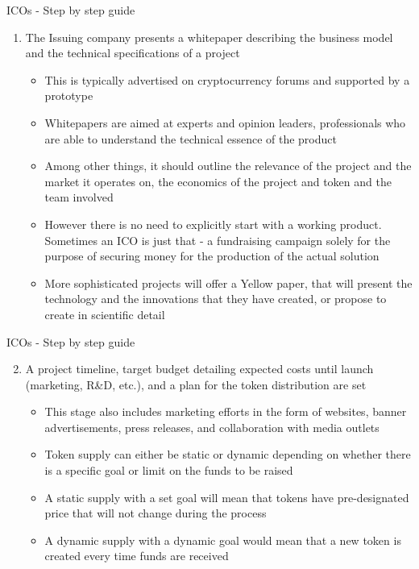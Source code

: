\documentclass[10pt]{beamer}
\begin{document}
\begin{frame}{ICOs - Step by step guide}
	\begin{enumerate}
		\item The Issuing company presents a whitepaper describing the business model and the technical specifications of a project
		\begin{itemize}
			\item This is typically advertised on cryptocurrency forums and supported by a prototype
			\item Whitepapers are aimed at experts and opinion leaders, professionals who are able to understand the technical essence of the product
			\item Among other things, it should outline the relevance of the project and the market it operates on, the economics of the project and token and the team involved
			\item However there is no need to explicitly start with a working product. Sometimes an ICO is just that - a fundraising campaign solely for the purpose of securing money for the production of the actual solution
			\item More sophisticated projects will offer a Yellow paper, that will present the technology and the innovations that they have created, or propose to create in scientific detail
		\end{itemize}
	\end{enumerate}
\end{frame}


\begin{frame}{ICOs - Step by step guide}
	\begin{enumerate}
		\setcounter{enumi}{1}
		\item A project timeline, target budget detailing expected costs until launch (marketing, R\&D, etc.), and a plan for the token distribution are set
		\begin{itemize}
			\item This stage also includes marketing efforts in the form of websites, banner advertisements, press releases, and collaboration with media outlets
			\item Token supply can either be static or dynamic depending on whether there is a specific goal or limit on the funds to be raised
			\item A static supply with a set goal will mean that tokens have pre-designated price that will not change during the process
			\item A dynamic supply with a dynamic goal would mean that a new token is created every time funds are received
		\end{itemize}
	\end{enumerate}
\end{frame}
\end{document}
